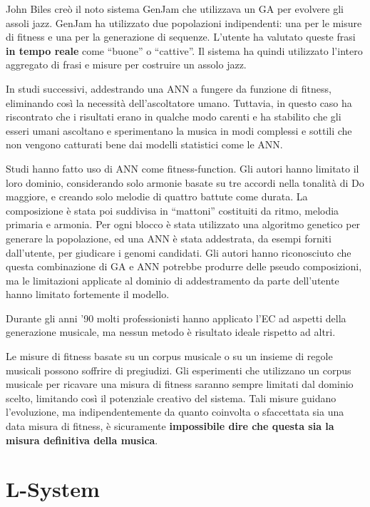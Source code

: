 \documentclass[a4paper,12pt]{report}
\begin{document}
John Biles creò il noto sistema GenJam che utilizzava un GA per evolvere gli assoli jazz. 
GenJam ha utilizzato due popolazioni indipendenti: una per le misure di fitness e una per la generazione di sequenze. 
L’utente ha valutato queste frasi \textbf{in tempo reale} come “buone” o “cattive”. 
Il sistema ha quindi utilizzato l'intero aggregato di frasi e misure per costruire un assolo jazz. 

In studi successivi, addestrando una ANN a fungere da funzione di fitness, eliminando così la necessità dell'ascoltatore umano.
Tuttavia, in questo caso ha riscontrato che i risultati erano in qualche modo carenti e ha stabilito che gli esseri umani ascoltano e sperimentano la musica in modi complessi e sottili che non vengono catturati bene dai modelli statistici come le ANN. 

Studi hanno fatto uso di ANN come fitness-function. 
Gli autori hanno limitato il loro dominio, considerando solo armonie basate su tre accordi nella tonalità di Do maggiore, e creando solo melodie di quattro battute come durata. 
La composizione è stata poi suddivisa in “mattoni” costituiti da ritmo, melodia primaria e armonia. 
Per ogni blocco è stata utilizzato una algoritmo genetico per generare la popolazione, ed una ANN è stata addestrata, da esempi forniti dall'utente, per giudicare i genomi candidati.
Gli autori hanno riconosciuto che questa combinazione di GA e ANN potrebbe produrre delle pseudo composizioni, 
ma le limitazioni applicate al dominio di addestramento da parte dell'utente hanno limitato fortemente il modello.

Durante gli anni ’90 molti professionisti hanno applicato l’EC ad aspetti della generazione musicale, ma nessun metodo è risultato ideale rispetto ad altri. 

Le misure di fitness basate su un corpus musicale o su un insieme di regole musicali possono soffrire di pregiudizi. 
Gli esperimenti che utilizzano un corpus musicale per ricavare una misura di fitness saranno sempre limitati dal dominio scelto, limitando così il potenziale creativo del sistema. 
Tali misure guidano l’evoluzione, ma indipendentemente da quanto coinvolta o sfaccettata sia una data misura di fitness, è sicuramente \textbf{impossibile dire che questa sia la misura definitiva della musica}.

\section{L-System}
\end{document}
